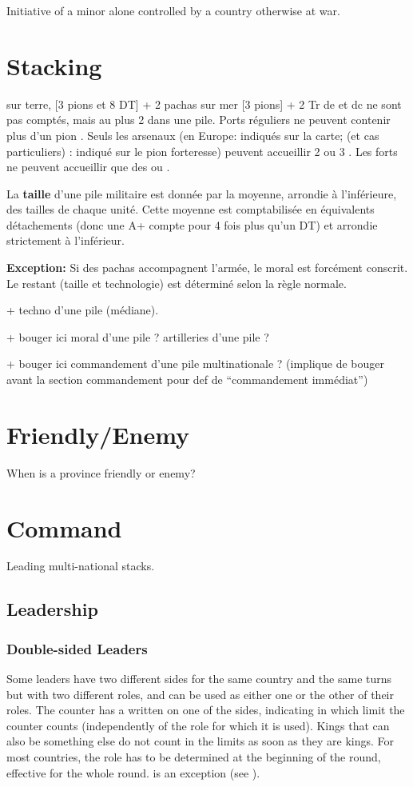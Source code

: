 Initiative of a minor alone controlled by a country otherwise at war.

\section{Stacking}\label{chMilitary:Stacking}
\aparag[Empilement]
\bparag sur terre, [3 pions et 8 DT] + 2 pachas
\bparag  sur mer [3 pions] + 2 Tr
\bparag de et dc ne sont pas comptés, mais au plus 2 dans une pile.
 Ports réguliers ne peuvent contenir plus d'un pion
\FLEET.  Seuls les arsenaux (en Europe: indiqués sur la carte; \ROTW (et cas
particuliers) : indiqué sur le pion forteresse) peuvent accueillir 2 ou 3
\FLEET.  Les forts ne peuvent accueillir que des \DN ou \NDE.

La \textbf{taille} d'une pile militaire est donnée par la moyenne,
arrondie à l'inférieure, des tailles de chaque unité. Cette moyenne
est comptabilisée en équivalents détachements (donc une A+
compte pour 4 fois plus qu'un DT) et arrondie strictement à l'inférieur.

\textbf{Exception:} Si des pachas accompagnent l'armée, le moral est forcément
conscrit. Le restant (taille et technologie) est déterminé selon la règle
normale.

+ techno d'une pile (médiane).

+ bouger ici moral d'une pile ? artilleries d'une pile ?

+ bouger ici commandement d'une pile multinationale ? (implique de bouger
avant la section commandement pour def de ``commandement immédiat'')

\section{Friendly/Enemy}
When is a province friendly or enemy?

\section{Command}
Leading multi-national stacks.

\subsection{Leadership}\label{chMilitary:Leadership}
\subsubsection{Double-sided Leaders}\label{chMilitary:Double Sided Leaders}
\aparag Some leaders have two different sides for the same country and the
same turns but with two different roles, and can be used as either one or the
other of their roles.
\bparag The counter has a {\textetoile} written on one of the sides,
indicating in which limit the counter counts (independently of the role
for which it is used).
\bparag Kings that can also be something else do not count in the limits
as soon as they are kings.
\bparag For most countries, the role has to be determined at the
beginning of the round, effective for the whole round. \POR is an
exception (see ).

